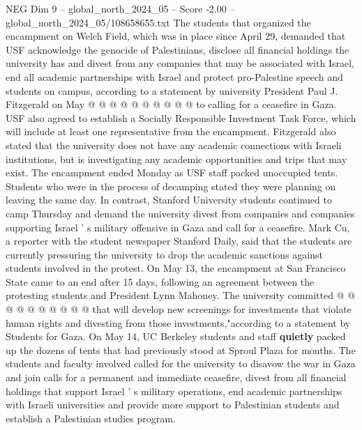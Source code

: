 \begin{textsample}{NEG Dim 9 – global\_north\_2024\_05 – Score -2.00 – global\_north\_2024\_05/108658655.txt}
The students that organized the encampment on Welch Field, which was in place since April 29, demanded that USF acknowledge the genocide of Palestinians, disclose all financial holdings the university has and divest from any companies that may be associated with Israel, end all academic partnerships with Israel and protect pro-Palestine speech and students on campus, according to a statement by university President Paul J.
Fitzgerald on May @ @ @ @ @ @ @ @ @ @ to calling for a ceasefire in Gaza.
USF also agreed to establish a Socially Responsible Investment Task Force, which will include at least one representative from the encampment.
Fitzgerald also stated that the university does not have any academic connections with Israeli institutions, but is investigating any academic opportunities and trips that may exist.
The encampment ended Monday as USF staff packed unoccupied tents.
Students who were in the process of decamping stated they were planning on leaving the same day.
In contrast, Stanford University students continued to camp Thursday and demand the university divest from companies and companies supporting Israel ' s military offensive in Gaza and call for a ceasefire.
Mark Cu, a reporter with the student newspaper Stanford Daily, said that the students are currently pressuring the university to drop the academic sanctions against students involved in the protest.
On May 13, the encampment at San Francisco State came to an end after 15 days, following an agreement between the protesting students and President Lynn Mahoney.
The university committed @ @ @ @ @ @ @ @ @ @ that will develop new screenings for investments that violate human rights and divesting from those investments,"according to a statement by Students for Gaza.
On May 14, UC Berkeley students and staff \textbf{quietly} packed up the dozens of tents that had previously stood at Sproul Plaza for months.
The students and faculty involved called for the university to disavow the war in Gaza and join calls for a permanent and immediate ceasefire, divest from all financial holdings that support Israel ' s military operations, end academic partnerships with Israeli universities and provide more support to Palestinian students and establish a Palestinian studies program.

\end{textsample}
